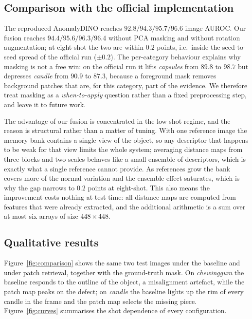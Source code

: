 \documentclass[10pt,twocolumn,letterpaper]{article}
\begin{document}
\subsection{Comparison with the official implementation}

The reproduced AnomalyDINO reaches $92.8/94.3/95.7/96.6$ image AUROC. Our
fusion reaches $94.4/95.6/96.3/96.4$ without PCA masking and without rotation
augmentation; at eight-shot the two are within $0.2$ points, i.e.\ inside the
seed-to-seed spread of the official run ($\pm0.2$). The per-category behaviour
explains why masking is not a free win: on the official run it lifts
\emph{capsules} from $89.8$ to $98.7$ but depresses \emph{candle} from $90.9$ to
$87.3$, because a foreground mask removes background patches that are, for this
category, part of the evidence. We therefore treat masking as a
\emph{when-to-apply} question rather than a fixed preprocessing step, and leave
it to future work.

The advantage of our fusion is concentrated in the low-shot regime, and the
reason is structural rather than a matter of tuning. With one reference image
the memory bank contains a single view of the object, so any descriptor that
happens to be weak for that view limits the whole system; averaging distance
maps from three blocks and two scales behaves like a small ensemble of
descriptors, which is exactly what a single reference cannot provide. As
references grow the bank covers more of the normal variation and the ensemble
effect saturates, which is why the gap narrows to $0.2$ points at eight-shot.
This also means the improvement costs nothing at test time: all distance maps
are computed from features that were already extracted, and the additional
arithmetic is a sum over at most six arrays of size $448\times448$.

\subsection{Qualitative results}

Figure~\ref{fig:comparison} shows the same two test images under the baseline
and under patch retrieval, together with the ground-truth mask. On
\emph{chewinggum} the baseline responds to the outline of the object, a
misalignment artefact, while the patch map peaks on the defect; on
\emph{candle} the baseline lights up the rim of every candle in the frame and
the patch map selects the missing piece. Figure~\ref{fig:curves} summarises the
shot dependence of every configuration.
\end{document}
